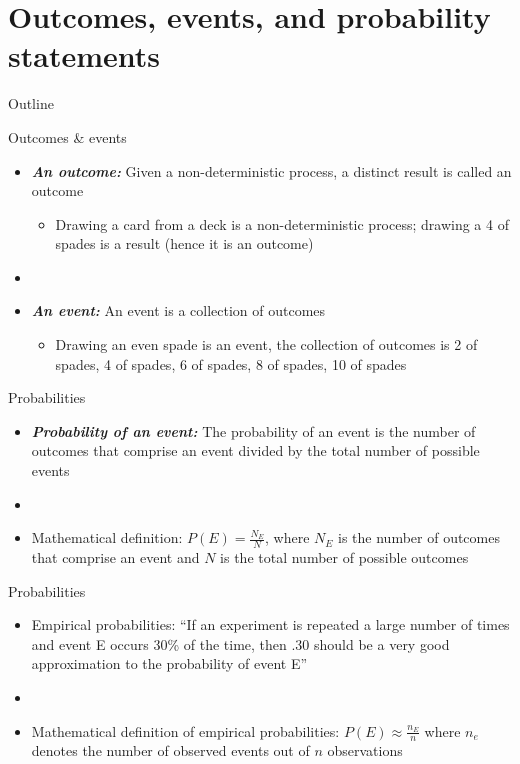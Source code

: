 \documentclass[xcolor=dvipsnames]{beamer}
\begin{document}
\section{Outcomes, events, and probability statements}
\begin{frame}{Outline}
\tableofcontents[currentsection,subsectionstyle=show/shaded/hide]
\end{frame}

\begin{frame}{Outcomes \& events}
	\begin{itemize}
		\item \textbf{\emph{An outcome:}} Given a non-deterministic process, a distinct result is called an outcome
		\begin{itemize}
			\item Drawing a card from a deck is a non-deterministic process; drawing a 4 of spades is a result (hence it is an outcome)
		\end{itemize}
		\item[]
		\item \textbf{\emph{An event:}} An event is a collection of outcomes
		\begin{itemize}
			\item Drawing an even spade is an event, the collection of outcomes is {2 of spades, 4 of spades, 6 of spades, 8 of spades, 10 of spades}
		\end{itemize}
	\end{itemize}
\end{frame}

\begin{frame}{Probabilities}
	\begin{itemize}
		\item \textbf{\emph{Probability of an event:}} The probability of an event is the number of outcomes that comprise an event divided by the total number of possible events
		\item[]
		\item Mathematical definition: $P(E) = \frac{N_E}{N}$, where $N_E$ is the number of outcomes that comprise an event and $N$ is the total number of possible outcomes
	\end{itemize}
\end{frame}

\begin{frame}{Probabilities}
\begin{itemize}
	\item Empirical probabilities: ``If an experiment is
	repeated a large number of times and event E occurs 30\% of the time, then .30
	should be a very good approximation to the probability of event E''
	\item[] 
	\item Mathematical definition of empirical probabilities: $P(E) \approx \frac{n_E}{n}$ where $n_e$ denotes the number of observed events out of $n$ observations
\end{itemize}
\end{frame}
\end{document}
